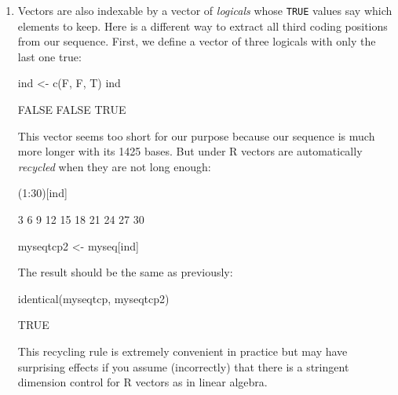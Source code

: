 \documentclass{article}
\begin{document}
\begin{enumerate}
\begin{Schunk}
\begin{Sinput}
 -tcp[1:10]
\end{Sinput}
\begin{Soutput}
 [1]  -3  -6  -9 -12 -15 -18 -21 -24 -27 -30
\end{Soutput}
\begin{Sinput}
 myseqfscp <- myseq[-tcp]
 myseqfscp[1:10]
\end{Sinput}
\begin{Soutput}
 [1] "a" "t" "a" "a" "c" "a" "g" "g" "g" "c"
\end{Soutput}
\end{Schunk}

\item Vectors are also indexable by a vector of \emph{logicals} whose \texttt{TRUE}
values say which elements to keep. Here is a different way to extract all third coding positions
from our sequence. First, we define a vector of three logicals with only the last one true:

\begin{Schunk}
\begin{Sinput}
 ind <- c(F, F, T)
 ind
\end{Sinput}
\begin{Soutput}
[1] FALSE FALSE  TRUE
\end{Soutput}
\end{Schunk}

This vector seems too short for our purpose because our sequence is much more longer
with its 1425 bases. But under R vectors are automatically \emph{recycled}
when they are not long enough:

\begin{Schunk}
\begin{Sinput}
 (1:30)[ind]
\end{Sinput}
\begin{Soutput}
 [1]  3  6  9 12 15 18 21 24 27 30
\end{Soutput}
\begin{Sinput}
 myseqtcp2 <- myseq[ind]
\end{Sinput}
\end{Schunk}

The result should be the same as previously:

\begin{Schunk}
\begin{Sinput}
 identical(myseqtcp, myseqtcp2)
\end{Sinput}
\begin{Soutput}
[1] TRUE
\end{Soutput}
\end{Schunk}

This recycling rule is extremely convenient in practice but may have surprising
effects if you assume (incorrectly) that there is a stringent dimension control for R vectors
as in linear algebra.

\end{enumerate}
\end{document}
